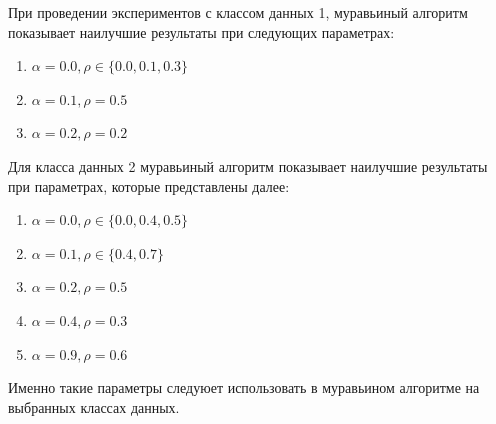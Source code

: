 При проведении экспериментов с классом данных 1, муравьиный алгоритм показывает наилучшие результаты при следующих параметрах:
\begin{enumerate}
    \item $\alpha = 0.0, \rho \in \{0.0, 0.1, 0.3\}$
    \item $\alpha = 0.1, \rho = 0.5$
    \item $\alpha = 0.2, \rho = 0.2$
\end{enumerate}
Для класса данных 2 муравьиный алгоритм показывает наилучшие результаты при параметрах, которые представлены далее:
\begin{enumerate}
    \item $\alpha = 0.0, \rho \in \{0.0, 0.4, 0.5\}$
    \item $\alpha = 0.1, \rho \in \{0.4, 0.7\}$
    \item $\alpha = 0.2, \rho = 0.5$
    \item $\alpha = 0.4, \rho = 0.3$
    \item $\alpha = 0.9, \rho = 0.6$
\end{enumerate}

Именно такие параметры следуюет использовать в муравьином алгоритме на выбранных классах данных.